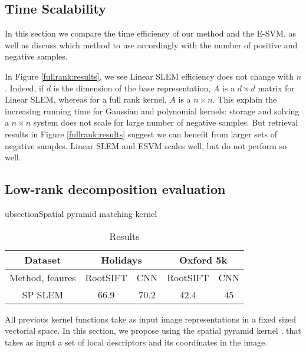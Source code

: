 \subsection{Time Scalability} \label{time-scale}
In this section we compare the time efficiency of our method and the E-SVM, as well as discuss which method to use accordingly with the number of positive and negative samples.

In Figure \ref{fullrank:results}, we see Linear SLEM efficiency does not change with $n$. 
Indeed, if $d$ is the dimension of the base representation, $A$ is a $d\times d$ matrix for Linear SLEM, whereas for a full rank kernel, $A$ is a $n\times n$. 
This explain the increasing running time for Gaussian and polynomial kernels: storage and solving a $n\times n$ system does not scale for large number of negative samples. 
But retrieval results in Figure \ref{fullrank:results} suggest we can benefit from larger sets of negative samples. Linear SLEM and ESVM scales well, but do not perform so well. 
\vspace{3 mm}


\subsection{Low-rank decomposition evaluation}



ubsection{Spatial pyramid matching kernel}

\begin{table}[!h]
    \centering
    \begin{tabular}{|c|c|c|c|c|}
    \hline
    Dataset & \multicolumn{2}{|c|}{\textbf{Holidays}} & \multicolumn{2}{|c|}{\textbf{Oxford 5k}}\\
    \hline
        Method, feaures & RootSIFT & CNN & RootSIFT
        &CNN \\
    \hline
    \hline
        SP SLEM & 66.9 & 70.2 & 42.4 & 45 \\
    \hline
    \end{tabular}
    \caption{Results }
    \label{tab:spk}
\end{table}
All previous kernel functions take as input image representations in a fixed sized vectorial space. In this section, we propose using the spatial pyramid kernel \cite{GrauDa05}, that takes as input a set of local descriptors and its coordinates in the image.

